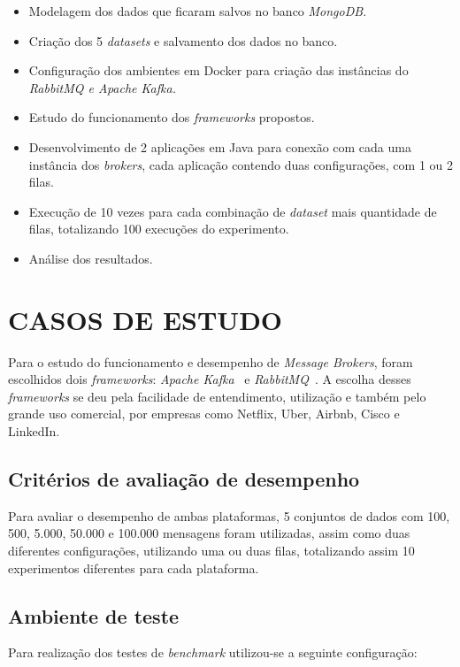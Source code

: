 \documentclass[letterpaper, 10 pt, conference]{ieeeconf}  %
\begin{document}
\begin{itemize}
\item Modelagem dos dados que ficaram salvos no banco \textit{MongoDB}.
\item Criação dos 5 \textit{datasets} e salvamento dos dados no banco.
\item Configuração dos ambientes em Docker para criação das instâncias do \textit{RabbitMQ e Apache Kafka.}
\item Estudo do funcionamento dos \textit{frameworks} propostos.
\item Desenvolvimento de 2 aplicações em Java para conexão com cada uma instância dos \textit{brokers}, cada aplicação contendo duas configurações, com 1 ou 2 filas.
\item Execução de 10 vezes para cada combinação de \textit{dataset} mais quantidade de filas, totalizando 100 execuções do experimento.
\item Análise dos resultados.
\end{itemize}


\section{CASOS DE ESTUDO}

Para o estudo do funcionamento e desempenho de  \textit{Message Brokers}, foram escolhidos dois \textit{frameworks}: \textit{Apache Kafka}~\cite{c1} e \textit{RabbitMQ}~\cite{c2}. A escolha desses \textit{frameworks} se deu pela facilidade de entendimento, utilização e também pelo grande uso comercial, por empresas como Netflix, Uber, Airbnb, Cisco e LinkedIn.

\subsection{Critérios de avaliação de desempenho}

Para avaliar o desempenho de ambas plataformas, 5 conjuntos de dados com 100, 500, 5.000, 50.000 e 100.000 mensagens foram utilizadas, assim como duas diferentes configurações, utilizando uma ou duas filas, totalizando assim 10 experimentos diferentes para cada plataforma. 

\subsection{Ambiente de teste}

Para realização dos testes de \textit{benchmark} utilizou-se a seguinte configuração:
\end{document}

